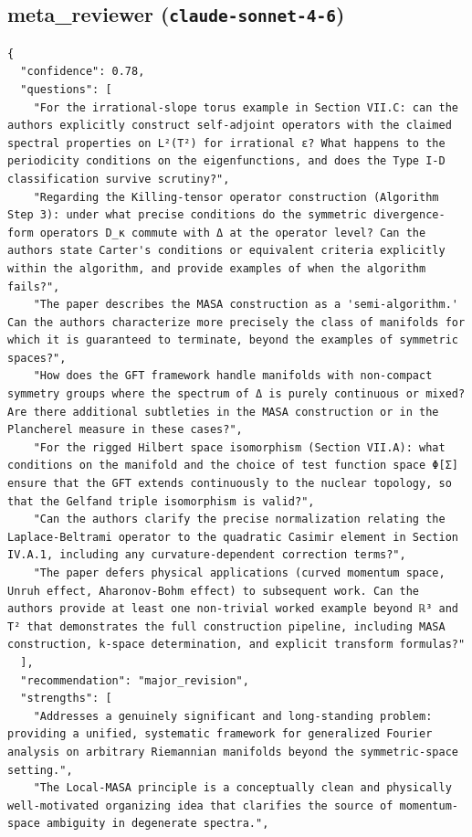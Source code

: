 \documentclass[11pt]{article}
\begin{document}
\subsection*{meta_reviewer (\texttt{claude-sonnet-4-6})}
\begin{verbatim}
{
  "confidence": 0.78,
  "questions": [
    "For the irrational-slope torus example in Section VII.C: can the authors explicitly construct self-adjoint operators with the claimed spectral properties on L²(T²) for irrational ε? What happens to the periodicity conditions on the eigenfunctions, and does the Type I-D classification survive scrutiny?",
    "Regarding the Killing-tensor operator construction (Algorithm Step 3): under what precise conditions do the symmetric divergence-form operators D_κ commute with Δ at the operator level? Can the authors state Carter's conditions or equivalent criteria explicitly within the algorithm, and provide examples of when the algorithm fails?",
    "The paper describes the MASA construction as a 'semi-algorithm.' Can the authors characterize more precisely the class of manifolds for which it is guaranteed to terminate, beyond the examples of symmetric spaces?",
    "How does the GFT framework handle manifolds with non-compact symmetry groups where the spectrum of Δ is purely continuous or mixed? Are there additional subtleties in the MASA construction or in the Plancherel measure in these cases?",
    "For the rigged Hilbert space isomorphism (Section VII.A): what conditions on the manifold and the choice of test function space Φ[Σ] ensure that the GFT extends continuously to the nuclear topology, so that the Gelfand triple isomorphism is valid?",
    "Can the authors clarify the precise normalization relating the Laplace-Beltrami operator to the quadratic Casimir element in Section IV.A.1, including any curvature-dependent correction terms?",
    "The paper defers physical applications (curved momentum space, Unruh effect, Aharonov-Bohm effect) to subsequent work. Can the authors provide at least one non-trivial worked example beyond ℝ³ and T² that demonstrates the full construction pipeline, including MASA construction, k-space determination, and explicit transform formulas?"
  ],
  "recommendation": "major_revision",
  "strengths": [
    "Addresses a genuinely significant and long-standing problem: providing a unified, systematic framework for generalized Fourier analysis on arbitrary Riemannian manifolds beyond the symmetric-space setting.",
    "The Local-MASA principle is a conceptually clean and physically well-motivated organizing idea that clarifies the source of momentum-space ambiguity in degenerate spectra.",

\end{verbatim}
\end{document}

